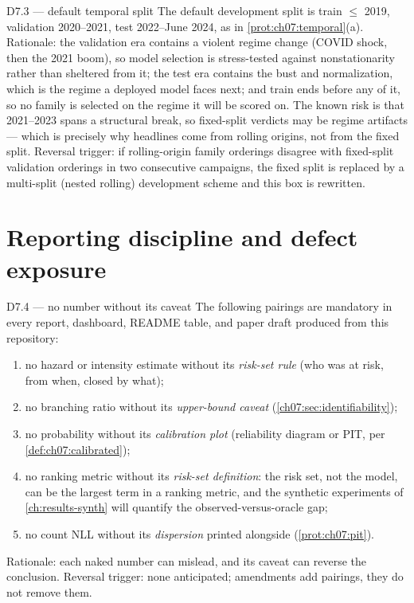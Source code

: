 \begin{decision}{D7.3 --- default temporal split}
The default development split is train $\le$ 2019, validation 2020--2021,
test 2022--June 2024, as in \cref{prot:ch07:temporal}(a). Rationale: the
validation era contains a violent regime change (COVID shock, then the
2021 boom), so model selection is stress-tested against nonstationarity
rather than sheltered from it; the test era contains the bust and
normalization, which is the regime a deployed model faces next; and
train ends before any of it, so no family is selected on the regime it
will be scored on. The known risk is that 2021--2023 spans a structural
break, so fixed-split verdicts may be regime artifacts --- which is
precisely why headlines come from rolling origins, not from the fixed
split. Reversal trigger: if rolling-origin family orderings disagree with
fixed-split validation orderings in two consecutive campaigns, the fixed
split is replaced by a multi-split (nested rolling) development scheme
and this box is rewritten.
\end{decision}

\section{Reporting discipline and defect exposure}\label{ch07:sec:reporting}

\begin{decision}{D7.4 --- no number without its caveat}
The following pairings are mandatory in every report, dashboard, README
table, and paper draft produced from this repository:
\begin{enumerate}[label=(\roman*)]
\item no hazard or intensity estimate without its \emph{risk-set rule}
(who was at risk, from when, closed by what);
\item no branching ratio without its \emph{upper-bound caveat}
(\cref{ch07:sec:identifiability});
\item no probability without its \emph{calibration plot} (reliability
diagram or PIT, per \cref{def:ch07:calibrated});
\item no ranking metric without its \emph{risk-set definition}: the risk
set, not the model, can be the largest term in a ranking metric, and the
synthetic experiments of \cref{ch:results-synth} will quantify the
observed-versus-oracle gap;
\item no count NLL without its \emph{dispersion} printed alongside
(\cref{prot:ch07:pit}).
\end{enumerate}
Rationale: each naked number can mislead, and its caveat can reverse the
conclusion. Reversal trigger: none anticipated; amendments add pairings,
they do not remove them.
\end{decision}

